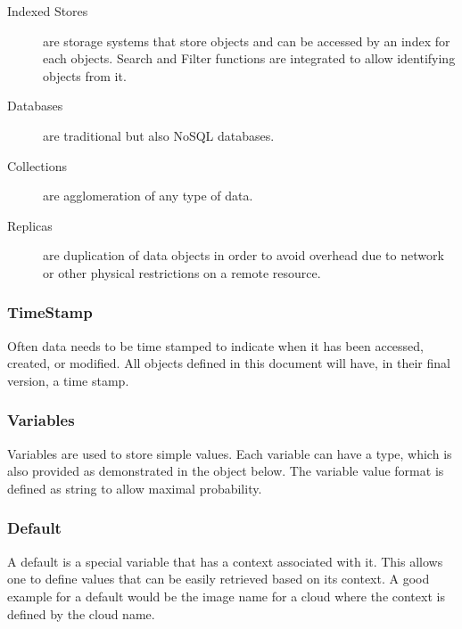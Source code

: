 \documentclass[10pt]{article}
\begin{document}
\begin{description}
\item[Indexed Stores] are storage systems that store objects and can be
  accessed by an index for each objects. Search and Filter functions
  are integrated to allow identifying objects from it.

\item[Databases] are traditional but also NoSQL databases.

\item[Collections] are agglomeration of any type of data.

\item[Replicas] are duplication of data objects in order to avoid
  overhead due to network or other physical restrictions on a remote
  resource.

\end{description}


\subsubsection{TimeStamp}

Often data needs to be time stamped to indicate when it has been
accessed, created, or modified. All objects defined in this document
will have, in their final version, a time stamp.


\subsubsection{Variables}

Variables are used to store simple values. Each variable can have a
type, which is also provided as demonstrated in the object below. The
variable value format is defined as string to allow maximal
probability. 


\subsubsection{Default}

A default is a special variable that has a context associated with
it. This allows one to define values that can be easily retrieved
based on its context. A good example for a default would be the image
name for a cloud where the context is defined by the cloud name.

\end{document}
